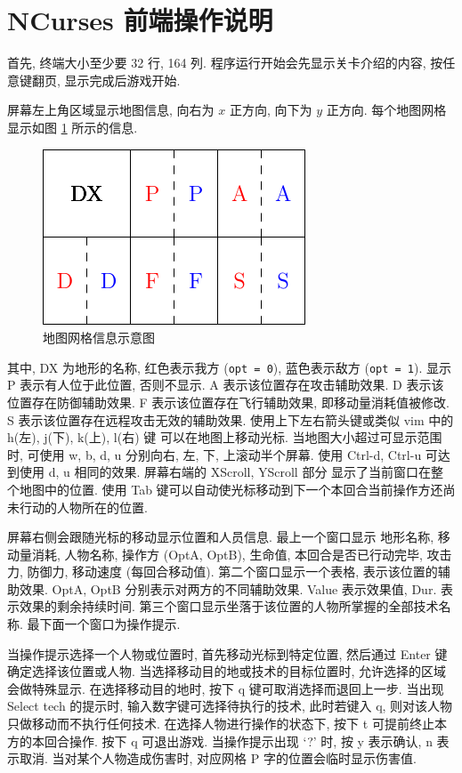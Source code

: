 \documentclass[UTF8, zihao=-4]{ctexart} %
\newcommand{\lcode}{\lstinline} % 段内插入代码
\begin{document}
\section{NCurses 前端操作说明}
\label{s_nc}
首先, 终端大小至少要 32 行, 164 列.
程序运行开始会先显示关卡介绍的内容, 按任意键翻页, 显示完成后游戏开始.

屏幕左上角区域显示地图信息, 向右为 $x$ 正方向, 向下为 $y$ 正方向. 
每个地图网格显示如图 \ref{f_grid} 所示的信息.
\begin{figure}
      \centering
      \includegraphics[scale=1.2]{grid.pdf}
      \caption{\label{f_grid}地图网格信息示意图}
\end{figure}
其中, DX 为地形的名称, 红色表示我方 (\lcode{opt = 0}), 蓝色表示敌方 (\lcode{opt = 1}).
显示 P 表示有人位于此位置, 否则不显示. A 表示该位置存在攻击辅助效果.
D 表示该位置存在防御辅助效果. F 表示该位置存在飞行辅助效果, 即移动量消耗值被修改.
S 表示该位置存在远程攻击无效的辅助效果. 使用上下左右箭头键或类似 vim 中的 h(左), j(下), k(上), l(右) 键
可以在地图上移动光标. 当地图大小超过可显示范围时, 可使用 w, b, d, u 分别向右, 左, 下, 上滚动半个屏幕. 
使用 Ctrl-d, Ctrl-u 可达到使用 d, u 相同的效果. 屏幕右端的 XScroll, YScroll 部分
显示了当前窗口在整个地图中的位置. 使用 Tab 键可以自动使光标移动到下一个本回合当前操作方还尚未行动的人物所在的位置.

屏幕右侧会跟随光标的移动显示位置和人员信息. 最上一个窗口显示
地形名称, 移动量消耗, 人物名称, 操作方 (OptA, OptB), 生命值, 本回合是否已行动完毕, 攻击力, 防御力, 移动速度 (每回合移动值).
第二个窗口显示一个表格, 表示该位置的辅助效果. OptA, OptB 分别表示对两方的不同辅助效果. Value 表示效果值, Dur. 表示效果的剩余持续时间.
第三个窗口显示坐落于该位置的人物所掌握的全部技术名称. 最下面一个窗口为操作提示. 

当操作提示选择一个人物或位置时, 首先移动光标到特定位置, 然后通过 Enter 键确定选择该位置或人物. 
当选择移动目的地或技术的目标位置时, 允许选择的区域会做特殊显示. 在选择移动目的地时, 
按下 q 键可取消选择而退回上一步. 当出现 Select tech 的提示时, 输入数字键可选择待执行的技术, 
此时若键入 q, 则对该人物只做移动而不执行任何技术. 在选择人物进行操作的状态下, 
按下 t 可提前终止本方的本回合操作. 按下 q 可退出游戏. 
当操作提示出现 `?' 时, 按 y 表示确认, n 表示取消. 当对某个人物造成伤害时, 对应网格 P 字的位置会临时显示伤害值.
\end{document}
